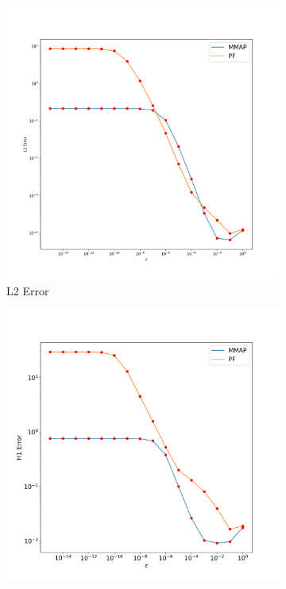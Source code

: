 \documentclass[12pt]{ociamthesis}
\begin{document}
\begin{figure}[H]
 \begin{subfigure}{0.44\textwidth}
     \includegraphics[width=\textwidth]{Pics/LHSims/E2/E2_NormalL2.png}
     \caption{L2 Error}
 \end{subfigure}
   \begin{subfigure}{0.44\textwidth}
     \includegraphics[width=\textwidth]{Pics/LHSims/E2/E2_NormalH1.png}

\end{subfigure}
\end{figure}
\end{document}

